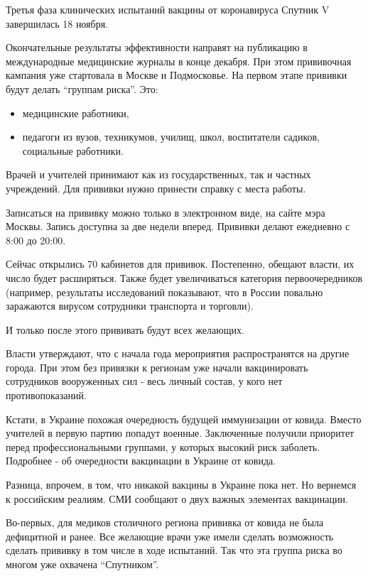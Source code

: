 Третья фаза клинических испытаний вакцины от коронавируса Спутник V завершилась
18 ноября.

Окончательные результаты эффективности направят на публикацию в международные
медицинские журналы в конце декабря. При этом прививочная кампания уже
стартовала в Москве и Подмосковье. На первом этапе прививки будут делать
\enquote{группам риска}. Это:

\begin{itemize}
\item медицинские работники, 
\item педагоги из вузов, техникумов, училищ, школ, воспитатели садиков,
социальные работники. 
\end{itemize}

Врачей и учителей принимают как из государственных, так и частных учреждений.
Для прививки нужно принести справку с места работы. 

Записаться на прививку можно только в электронном виде, на сайте мэра Москвы.
Запись доступна за две недели вперед. Прививки делают ежедневно с 8:00 до
20:00.

Сейчас открылись 70 кабинетов для прививок. Постепенно, обещают власти, их
число будет расширяться. Также будет увеличиваться категория первоочередников
(например, результаты исследований показывают, что в России повально заражаются
вирусом сотрудники транспорта и торговли). 

И только после этого прививать будут всех желающих. 

Власти утверждают, что с начала года мероприятия распространятся на другие
города. При этом без привязки к регионам уже начали вакцинировать сотрудников
вооруженных сил - весь личный состав, у кого нет противопоказаний. 

Кстати, в Украине похожая очередность будущей иммунизации от ковида. Вместо
учителей в первую партию попадут военные. Заключенные получили приоритет перед
профессиональными группами, у которых высокий риск заболеть. Подробнее - об
очередности вакцинации в Украине от ковида.

Разница, впрочем, в том, что никакой вакцины в Украине пока нет. Но вернемся к
российским реалиям. СМИ сообщают о двух важных элементах вакцинации. 

Во-первых, для медиков столичного региона прививка от ковида не была дефицитной
и ранее. Все желающие врачи уже имели сделать возможность сделать прививку в
том числе в ходе испытаний. Так что эта группа риска во многом уже охвачена
\enquote{Спутником}.

